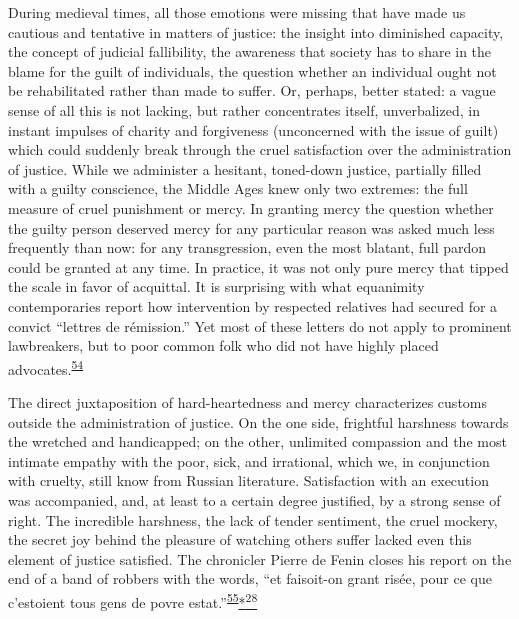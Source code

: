 During medieval times, all those emotions were missing that have made us
cautious and tentative in matters of justice: the insight into
diminished capacity, the concept of judicial fallibility, the awareness
that society has to share in the blame for the guilt of individuals, the
question whether an individual ought not be rehabilitated rather than
made to suffer. Or, perhaps, better stated: a vague sense of all this is
not lacking, but rather concentrates itself, unverbalized, in instant
impulses of charity and forgiveness (unconcerned with the issue of
guilt) which could suddenly break through the cruel satisfaction over
the administration of justice. While we administer a hesitant,
toned-down justice, partially filled with a guilty conscience, the
Middle Ages knew only two extremes: the full measure of cruel punishment
or mercy. In granting mercy the question whether the guilty person
deserved mercy for any particular reason was asked much less frequently
than now: for any transgression, even the most blatant, full pardon
could be granted at any time. In practice, it was not only pure mercy
that tipped the scale in favor of acquittal. It is surprising with what
equanimity contemporaries report how intervention by respected relatives
had secured for a convict ``lettres de rémission.'' Yet most of these
letters do not apply to prominent lawbreakers, but to poor common folk
who did not have highly placed
advocates.\textsuperscript{\protect\hypertarget{08_Chapter_One__THE_PASSIONATE_INTE.xhtmlux5cux23id_2123}{\protect\hyperlink{23_NOTES.xhtmlux5cux23id_2124}{54}}}

The direct juxtaposition of hard-heartedness and mercy characterizes
customs outside the administration of justice. On the one side,
frightful harshness towards the wretched and handicapped; on the other,
unlimited compassion and the most intimate empathy with the poor, sick,
and irrational, which we, in conjunction with cruelty, still know from
Russian literature. Satisfaction with an execution was accompanied, and,
at least to a certain degree justified, by a strong sense of right. The
incredible harshness, the lack of tender sentiment, the cruel mockery,
the secret joy behind the pleasure of watching others suffer lacked even
this element of justice satisfied. The chronicler Pierre de Fenin closes
his report on the end of a band of robbers with the words, ``et
faisoit-on grant risée, pour ce que c'estoient tous gens de povre
estat.''\textsuperscript{\protect\hypertarget{08_Chapter_One__THE_PASSIONATE_INTE.xhtmlux5cux23id_2121}{\protect\hyperlink{23_NOTES.xhtmlux5cux23id_2122}{55}}}\protect\hypertarget{08_Chapter_One__THE_PASSIONATE_INTE.xhtmlux5cux23id_2389}{\protect\hyperlink{23_NOTES.xhtmlux5cux23id_2390}{*\textsuperscript{28}}}


